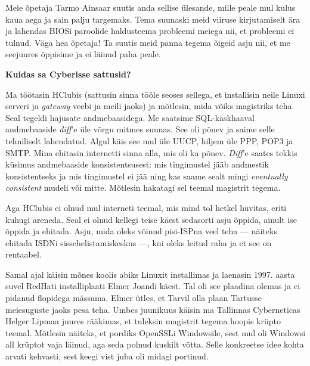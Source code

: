 Meie õpetaja Tarmo Ainsaar suutis anda sellise ülesande, mille peale mul kulus kaua aega ja
sain palju targemaks. Tema suunaski meid viiruse kirjutamiselt ära ja lahendas BIOSi
paroolide haldusteema probleemi meiega nii, et probleemi ei tulnud. Väga hea
õpetaja! Ta suutis meid panna tegema õigeid asju nii, et me seejuures õppisime
ja ei läinud paha peale.

\textbf{Kuidas sa Cyberisse sattusid?}

Ma töötasin HClubis (sattusin sinna tööle seoses sellega, et
installisin neile Linuxi serveri ja \emph{gateway} veebi ja meili jaoks) ja
mõtlesin, mida võiks magistriks teha. Seal tegeldi hajusate andmebaasidega.
Me saatsime SQL-käskhaaval andmebaaside \emph{diff}'e üle võrgu mitmes suunas.
See oli põnev ja saime selle tehniliselt lahendatud. Algul käis see mul üle
UUCP, hiljem üle PPP, POP3 ja SMTP. Mina ehitasin internetti sinna alla, mis oli
ka põnev. \emph{Diff}'e saates tekkis küsimus andmebaaside
konsistentsusest: mis tingimustel jääb andmestik konsistentseks ja mis tingimustel ei jää ning kas saame sealt mingi \emph{eventually consistent} mudeli 
või mitte. Mõtlesin hakatagi sel teemal magistrit tegema.

Aga HClubis ei olnud mul interneti teemal, mis mind tol hetkel huvitas, eriti
kuhugi areneda. Seal ei olnud kellegi teise käest sedasorti asju õppida, ainult
ise õppida ja ehitada. Asju, mida oleks võinud pisi-ISPna veel teha ---
näiteks ehitada ISDNi sissehelistamiskeskus ---, kui oleks leitud raha ja et see on
rentaabel.

Samal ajal käisin mõnes koolis abiks Linuxit installimas ja laenasin 1997. aasta suvel
RedHati installiplaati Elmer Joandi
käest. Tal oli see plaadina olemas ja ei pidanud
flopidega mässama. Elmer ütles, et Tarvil olla plaan
Tartusse meiesuguste jaoks pesa teha. Umbes juunikuus käisin ma
Tallinnas Cyberneticas Helger Lipmaa  juures rääkimas, et tuleksin magistrit tegema hoopis krüpto teemal. Mõtlesin näiteks,
et pordiks OpenSSLi Windowsile, sest
mul oli Windowsi all krüptot vaja läinud, aga seda polnud kuskilt võtta. Selle
konkreetse idee kohta arvati kehvasti, sest keegi vist juba oli midagi portinud.

